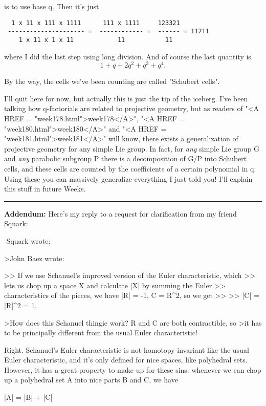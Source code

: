 is to use base q.  Then it's just 

\begin{verbatim}
  1 x 11 x 111 x 1111      111 x 1111     123321
 --------------------- =  ------------ =  ------ = 11211
    1 x 11 x 1 x 11            11           11 
\end{verbatim}
    
where I did the last step using long division.  And of course the
last quantity is 
$$
1 + q + 2q^{2} + q^{3} + q^{4}.
$$
    

By the way, the cells we've been counting are called "Schubert cells".

I'll quit here for now, but actually this is just the tip of the
iceberg.  I've been talking how q-factorials are related to projective
geometry, but as readers of "<A HREF = "week178.html">week178</A>", "<A HREF = "week180.html">week180</A>" and "<A HREF = "week181.html">week181</A>" will
know, there exists a generalization of projective geometry for any
simple Lie group.  In fact, for \emph{any} simple Lie group G and \emph{any}
parabolic subgroup P there is a decomposition of G/P into Schubert
cells, and these cells are counted by the coefficients of a certain
polynomial in q.  Using these you can massively generalize everything 
I just told you!  I'll explain this stuff in future Weeks.
 
\par\noindent\rule{\textwidth}{0.4pt}

\textbf{Addendum:} Here's my reply to a request for clarification
from my friend Squark:

$$
Squark wrote:

>John Baez wrote:

>> If we use Schanuel's improved version of the Euler characteristic, which
>> lets us chop up a space X and calculate |X| by summing the Euler
>> characteristics of the pieces, we have |R| = -1, C = R^2, so we get
>> 
>> |C| = |R|^2 = 1.

>How does this Schanuel thingie work? R and C are both contractible, so
>it has to be principally different from the usual Euler characteristic!

Right.  Schanuel's Euler characteristic is not homotopy invariant like 
the usual Euler characteristic, and it's only defined for nice spaces,
like polyhedral sets.   However, it has a great property to make up 
for these sins: whenever we can chop up a polyhedral set A into nice parts 
B and C, we have

|A| = |B| + |C|


